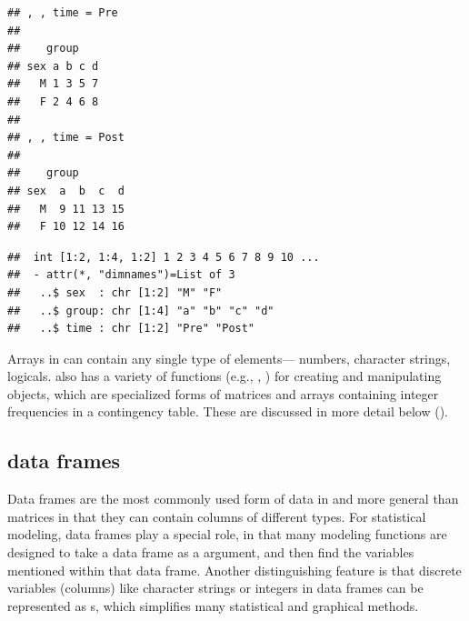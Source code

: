 \documentclass[11pt]{book}
\renewenvironment{knitrout}{\small\renewcommand{\baselinestretch}{.85}}{} %
\begin{document}
\begin{knitrout}
\color{fgcolor}\begin{kframe}
\begin{alltt}
 \hlkwb{<-} \hlstd{(}\hlstd{=}\hlstd{(}\hlstd{,} \hlstd{),}
                         \hlstd{=letters[}\hlopt{:}\hlstd{],}
                         \hlstd{=}\hlstd{(}\hlstd{,} \hlstd{))}
\end{alltt}
\begin{verbatim}
## , , time = Pre
## 
##    group
## sex a b c d
##   M 1 3 5 7
##   F 2 4 6 8
## 
## , , time = Post
## 
##    group
## sex  a  b  c  d
##   M  9 11 13 15
##   F 10 12 14 16
\end{verbatim}
\begin{alltt}
\end{alltt}
\begin{verbatim}
##  int [1:2, 1:4, 1:2] 1 2 3 4 5 6 7 8 9 10 ...
##  - attr(*, "dimnames")=List of 3
##   ..$ sex  : chr [1:2] "M" "F"
##   ..$ group: chr [1:4] "a" "b" "c" "d"
##   ..$ time : chr [1:2] "Pre" "Post"
\end{verbatim}
\end{kframe}
\end{knitrout}
Arrays in \R can contain any single type of elements--- numbers,
character strings, logicals.  \R also has a variety of functions
(e.g., , )
for creating and manipulating  objects, which are 
specialized forms of matrices and arrays containing integer
frequencies in a contingency table. These are discussed in more
detail below ().

\subsection{data frames}\label{sec:data-frames}
Data frames are the most commonly used form of data in \R and more
general than matrices in that they can contain columns of different types.
For statistical modeling, data frames play a special role, in that
many modeling functions are designed to take a data frame as a
 argument, and then find the variables mentioned within
that data frame. Another distinguishing feature is that discrete variables
(columns) like character strings  or integers 
in data frames can be represented as s, which simplifies
many statistical and graphical methods.
\end{document}
